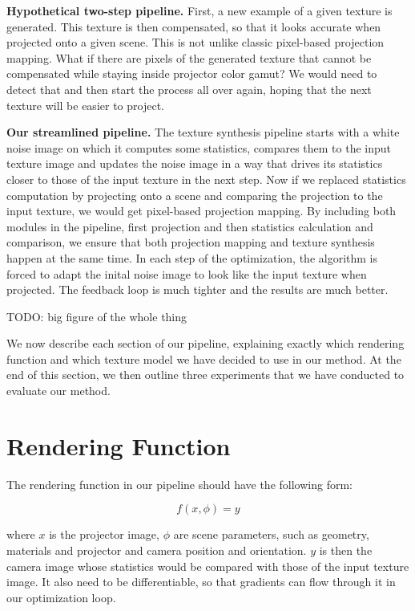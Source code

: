 \textbf{Hypothetical two-step pipeline.} First, a new example of a given texture is generated. This texture is then compensated, so that it looks accurate when projected onto a given scene. This is not unlike classic pixel-based projection mapping. What if there are pixels of the generated texture that cannot be compensated while staying inside projector color gamut? We would need to detect that and then start the process all over again, hoping that the next texture will be easier to project.

\textbf{Our streamlined pipeline.} The texture synthesis pipeline starts with a white noise image on which it computes some statistics, compares them to the input texture image and updates the noise image in a way that drives its statistics closer to those of the input texture in the next step. Now if we replaced statistics computation by projecting onto a scene and comparing the projection to the input texture, we would get pixel-based projection mapping. By including both modules in the pipeline, first projection and then statistics calculation and comparison, we ensure that both projection mapping and texture synthesis happen at the same time. In each step of the optimization, the algorithm is forced to adapt the inital noise image to look like the input texture when projected. The feedback loop is much tighter and the results are much better.

{\color{red} TODO: big figure of the whole thing}

We now describe each section of our pipeline, explaining exactly which rendering function and which texture model we have decided to use in our method. At the end of this section, we then outline three experiments that we have conducted to evaluate our method.

\section{Rendering Function}
\label{section:methods-rendering_function}

The rendering function in our pipeline should have the following form:

\begin{equation}
    \label{eq:rendering_function}
    f(x, \phi) = y  
\end{equation}

where \(x\) is the projector image, \(\phi\) are scene parameters, such as geometry, materials and projector and camera position and orientation. \(y\) is then the camera image whose statistics would be compared with those of the input texture image. It also need to be differentiable, so that gradients can flow through it in our optimization loop.

